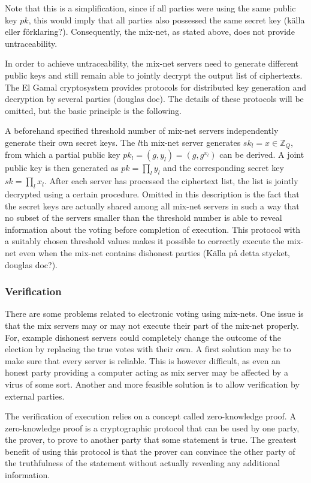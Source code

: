 Note that this is a simplification, since if all parties were using
the same public key $pk$, this would imply that all parties also
possessed the same secret key (källa eller förklaring?). Consequently,
the mix-net, as stated above, does not provide untraceability.

In order to achieve untraceability, the mix-net servers need to
generate different public keys and still remain able to jointly
decrypt the output list of ciphertexts. The El Gamal cryptosystem
provides protocols for distributed key generation and decryption by
several parties (douglas doc). The details of these protocols will be
omitted, but the basic principle is the following.

A beforehand specified threshold number of mix-net servers
independently generate their own secret keys. The $l$th mix-net server
generates $sk_l = x \in \mathbb{Z}_Q$, from which a partial public key
$pk_l = (g,y_l) = (g,g^{x_l})$ can be derived. A joint public key is
then generated as $pk = \prod_l y_l$ and the corresponding secret key
$sk = \prod_l x_l$. After each server has processed the ciphertext
list, the list is jointly decrypted using a certain procedure. Omitted
in this description is the fact that the secret keys are actually
shared among all mix-net servers in such a way that no subset of the
servers smaller than the threshold number is able to reveal
information about the voting before completion of execution. This
protocol with a suitably chosen threshold values makes it possible to
correctly execute the mix-net even when the mix-net contains dishonest
parties (Källa på detta stycket, douglas doc?).

\subsubsection{Verification}
There are some problems related to electronic voting using
mix-nets. One issue is that the mix servers may or may not execute
their part of the mix-net properly. For, example dishonest servers
could completely change the outcome of the election by replacing the
true votes with their own. A first solution may be to make sure that
every server is reliable. This is however difficult, as even an honest
party providing a computer acting as mix server may be affected by a
virus of some sort. Another and more feasible solution is to allow
verification by external parties.

The verification of execution relies on a concept called
zero-knowledge proof. A zero-knowledge proof is a cryptographic
protocol that can be used by one party, the prover, to prove to
another party that some statement is true. The greatest benefit of
using this protocol is that the prover can convince the other party of
the truthfulness of the statement without actually revealing any
additional information.

